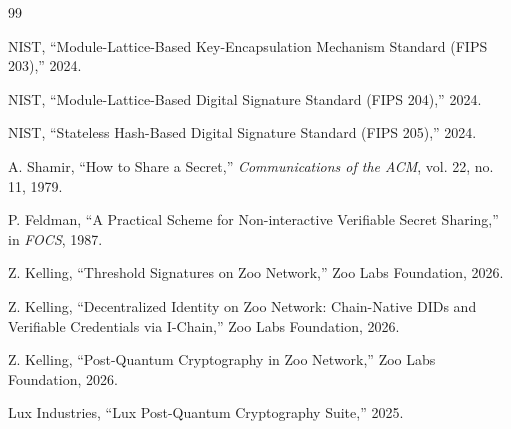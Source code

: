 \documentclass[11pt,letterpaper]{article}
\theoremstyle{definition}
\theoremstyle{remark}
\begin{document}
\begin{thebibliography}{99}

NIST, ``Module-Lattice-Based Key-Encapsulation Mechanism Standard (FIPS 203),'' 2024.

NIST, ``Module-Lattice-Based Digital Signature Standard (FIPS 204),'' 2024.

NIST, ``Stateless Hash-Based Digital Signature Standard (FIPS 205),'' 2024.

A. Shamir, ``How to Share a Secret,'' \textit{Communications of the ACM}, vol. 22, no. 11, 1979.

P. Feldman, ``A Practical Scheme for Non-interactive Verifiable Secret Sharing,'' in \textit{FOCS}, 1987.

Z. Kelling, ``Threshold Signatures on Zoo Network,'' Zoo Labs Foundation, 2026.

Z. Kelling, ``Decentralized Identity on Zoo Network: Chain-Native DIDs and Verifiable Credentials via I-Chain,'' Zoo Labs Foundation, 2026.

Z. Kelling, ``Post-Quantum Cryptography in Zoo Network,'' Zoo Labs Foundation, 2026.

Lux Industries, ``Lux Post-Quantum Cryptography Suite,'' 2025.

\end{thebibliography}
\end{document}
